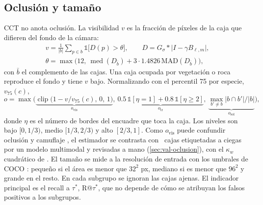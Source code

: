 \documentclass{article}
\DeclareMathOperator{\clip}{clip}
\DeclareMathOperator{\med}{med}
\begin{document}
\subsection{Oclusión y tamaño}
\label{sec:oclusion}
CCT no anota oclusión. La visibilidad \(v\) es la fracción de píxeles de la caja que difieren del fondo de la cámara:
\begin{equation}
  \begin{gathered}
  v = \frac{1}{|b|}\sum_{p\in b} \mathbb{1}\big[D(p) > \theta\big], \qquad
  D = G_{\sigma} * \big| I - \gamma B_{\ell,m} \big|, \\
  \theta = \max\big(12,\ \med(D_{\bar b}) + 3 \cdot 1.4826\,\mathrm{MAD}(D_{\bar b})\big),
  \end{gathered}
  \label{eq:visibilidad}
\end{equation}
con \(\bar b\) el complemento de las cajas. Una caja ocupada por vegetación o roca reproduce el fondo y tiene \(v\) bajo. Normalizando con el percentil 75 por especie, \(v_{75}(c)\),
\begin{equation}
  o = \max\Big(\underbrace{\clip\big(1 - v/v_{75}(c),\,0,\,1\big)}_{o_{\mathrm{vis}}},\ \underbrace{0.5\,\mathbb{1}[\eta = 1] + 0.8\,\mathbb{1}[\eta \ge 2]}_{o_{\mathrm{tr}}},\ \underbrace{\max_{b'\neq b} |b\cap b'|/|b|}_{o_{\mathrm{sol}}}\Big),
  \label{eq:oclusion}
\end{equation}
donde \(\eta\) es el número de bordes del encuadre que toca la caja. Los niveles son bajo \([0, 1/3)\), medio \([1/3, 2/3)\) y alto \([2/3, 1]\). Como \(o_{\mathrm{vis}}\) puede confundir oclusión y camuflaje \parencite{beery2018}, el estimador se contrasta con \nValOcl\ cajas etiquetadas a ciegas por un modelo multimodal \parencite{anthropic2026claude} y revisadas a mano (\cref{sec:val-oclusion}), con el \(\kappa_w\) cuadrático de \textcite{cohen1968}.
El tamaño se mide a la resolución de entrada con los umbrales de COCO \parencite{lin2014coco}: pequeño si el área es menor que \(32^2\) px, mediano si es menor que \(96^2\) y grande en el resto. En cada subgrupo se ignoran las cajas ajenas. El indicador principal es el recall a \(\tau^\ast\), R@\(\tau^\ast\), que no depende de cómo se atribuyan los falsos positivos a los subgrupos.
\end{document}
